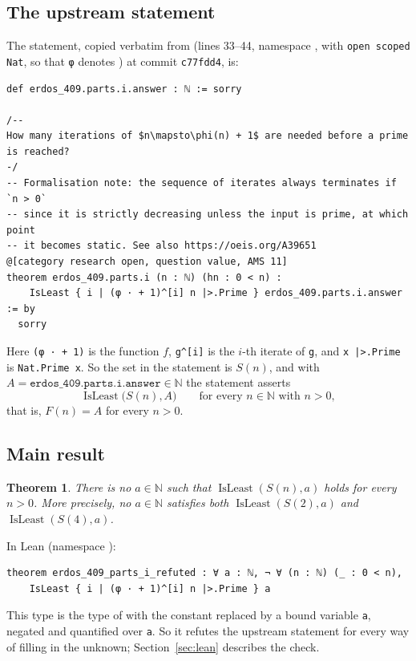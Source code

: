 \documentclass[11pt]{amsart}
\theoremstyle{plain}
\newtheorem{theorem}{Theorem}
\theoremstyle{definition}
\newcommand{\N}{\mathbb{N}}
\DeclareMathOperator{\IsLeast}{IsLeast}
\begin{document}
\subsection{The upstream statement}
The statement, copied verbatim from  (lines 33--44, namespace , with \texttt{open scoped Nat}, so that \texttt{φ} denotes ) at commit \texttt{c77fdd4}, is:
\begin{lstlisting}
def erdos_409.parts.i.answer : ℕ := sorry

/--
How many iterations of $n\mapsto\phi(n) + 1$ are needed before a prime is reached?
-/
-- Formalisation note: the sequence of iterates always terminates if `n > 0`
-- since it is strictly decreasing unless the input is prime, at which point
-- it becomes static. See also https://oeis.org/A39651
@[category research open, question value, AMS 11]
theorem erdos_409.parts.i (n : ℕ) (hn : 0 < n) :
    IsLeast { i | (φ · + 1)^[i] n |>.Prime } erdos_409.parts.i.answer := by
  sorry
\end{lstlisting}
Here \texttt{(φ · + 1)} is the function $f$, \texttt{g\^{}[i]} is the $i$-th iterate of \texttt{g}, and \texttt{x |>.Prime} is \texttt{Nat.Prime x}. So the set in the statement is $S(n)$, and with $A=\texttt{erdos\_409.parts.i.answer}\in\N$ the statement asserts
\begin{equation}\label{eq:upstream}
\IsLeast\bigl(S(n),A\bigr)\qquad\text{for every } n\in\N \text{ with } n>0,
\end{equation}
that is, $F(n)=A$ for every $n>0$.

\subsection{Main result}

\begin{theorem}\label{thm:main}
There is no $a\in\N$ such that $\IsLeast(S(n),a)$ holds for every $n>0$. More precisely, no $a\in\N$ satisfies both $\IsLeast(S(2),a)$ and $\IsLeast(S(4),a)$.
\end{theorem}

In Lean (namespace ):
\begin{lstlisting}
theorem erdos_409_parts_i_refuted : ∀ a : ℕ, ¬ ∀ (n : ℕ) (_ : 0 < n),
    IsLeast { i | (φ · + 1)^[i] n |>.Prime } a
\end{lstlisting}
This type is the type of  with the constant  replaced by a bound variable \texttt{a}, negated and quantified over \texttt{a}. So it refutes the upstream statement for every way of filling in the unknown; Section~\ref{sec:lean} describes the check.
\end{document}
